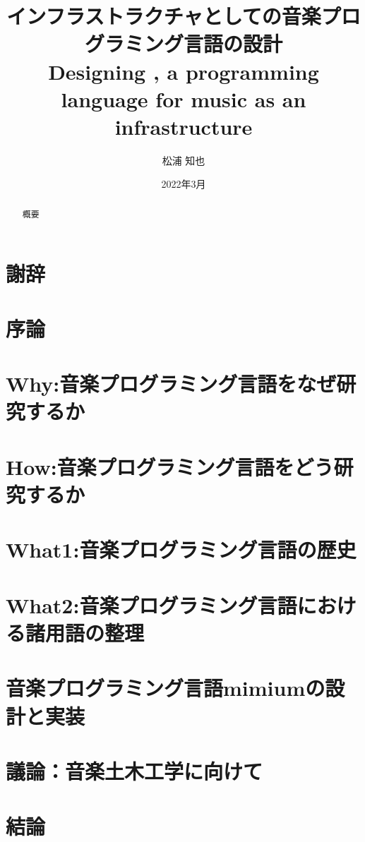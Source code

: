 \documentclass[dvipdfmx,a4paper,openany]{jsbook}
\title{インフラストラクチャとしての音楽プログラミング言語\mimium{}の設計\\
Designing \mimium{}, a programming language for music as an infrastructure
}
\author{松浦 知也}
\date{2022年3月}
\begin{document}
\maketitle

\begin{abstract}
\chapter*{概要}
    
\end{abstract}

\chapter*{謝辞}


\setcounter{tocdepth}{3}
\tableofcontents

\chapter{序論}


\chapter{Why:音楽プログラミング言語をなぜ研究するか}


\chapter{How:音楽プログラミング言語をどう研究するか}


\chapter{What1:音楽プログラミング言語の歴史}


\chapter{What2:音楽プログラミング言語における諸用語の整理}


\chapter{音楽プログラミング言語mimiumの設計と実装}


\chapter{議論：音楽土木工学に向けて}


\chapter{結論}


\printbibliography[title = 参考文献]
\end{document}
